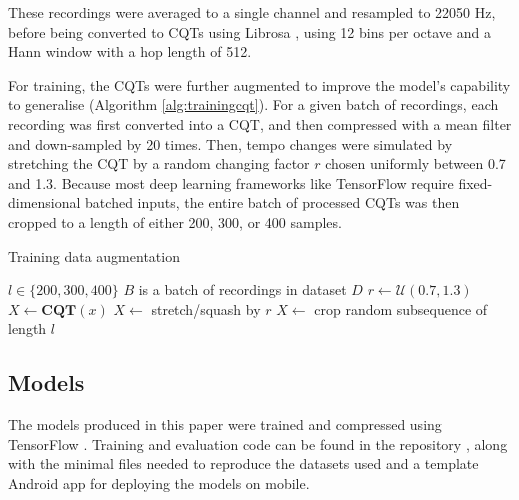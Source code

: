 \documentclass{article}
\begin{document}
These recordings were averaged to a single channel and resampled to 22050 Hz, before being converted to CQTs using Librosa \cite{McFee2015}, using 12 bins per octave and a Hann window with a hop length of 512.

For training, the CQTs were further augmented to improve the model's capability to generalise (Algorithm \ref{alg:trainingcqt}). For a given batch of recordings, each recording was first converted into a CQT, and then compressed with a mean filter and down-sampled by 20 times. Then, tempo changes were simulated by stretching the CQT by a random changing factor $r$ chosen uniformly between 0.7 and 1.3. Because most deep learning frameworks like TensorFlow require fixed-dimensional batched inputs, the entire batch of processed CQTs was then cropped to a length of either 200, 300, or 400 samples.

\begin{algorithm}
    \caption{Training data augmentation}
    \label{alg:trainingcqt}
    \begin{algorithmic}
        \Require $l\in \{200, 300, 400\}$
        \Ensure $B$ is a batch of recordings in dataset $D$
            \State $r \gets \mathcal{U}(0.7, 1.3)$
            \State $X \gets \mathbf{CQT}(x)$
            \State $X \gets$ stretch/squash by $r$
            \State $X \gets$ crop random subsequence of length $l$
        \EndFor
    \end{algorithmic}
\end{algorithm}

\subsection{Models}\label{sec:models}
The models produced in this paper were trained and compressed using TensorFlow \cite{tensorflow2015}. Training and evaluation code can be found in the repository \cite{Vivian2024}, along with the minimal files needed to reproduce the datasets used and a template Android app for deploying the models on mobile.
\end{document}

